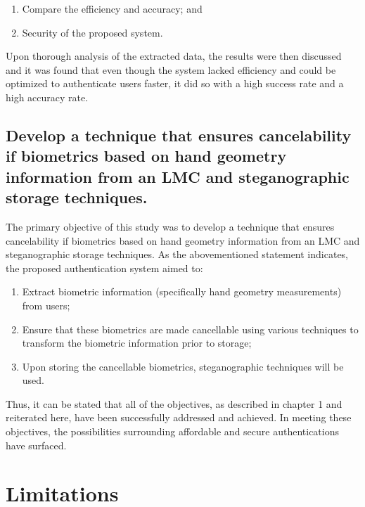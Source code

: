 \begin{enumerate}[label=\roman*.]
    \item Compare the efficiency and accuracy; and 
    \item Security of the proposed system.
\end{enumerate}

Upon thorough analysis of the extracted data, the results were then discussed and it was found that even though the system lacked efficiency and could be optimized to authenticate users faster, it did so with a high success rate and a high accuracy rate.

\subsection{Develop a technique that ensures cancelability if biometrics based on hand geometry information from an LMC and steganographic storage techniques.}

The primary objective of this study was to develop a technique that ensures cancelability if biometrics based on hand geometry information from an LMC and steganographic storage techniques. As the abovementioned statement indicates, the proposed authentication system aimed to:

\begin{enumerate}[label=\roman*.]
    \item Extract biometric information (specifically hand geometry measurements) from users;
    \item Ensure that these biometrics are made cancellable using various techniques to transform the biometric information prior to storage; 
    \item Upon storing the cancellable biometrics, steganographic techniques will be used.
\end{enumerate}

Thus, it can be stated that all of the objectives, as described in chapter 1 and reiterated here, have been successfully addressed and achieved. In meeting these objectives, the possibilities surrounding affordable and secure authentications have surfaced. 

\section{Limitations}

